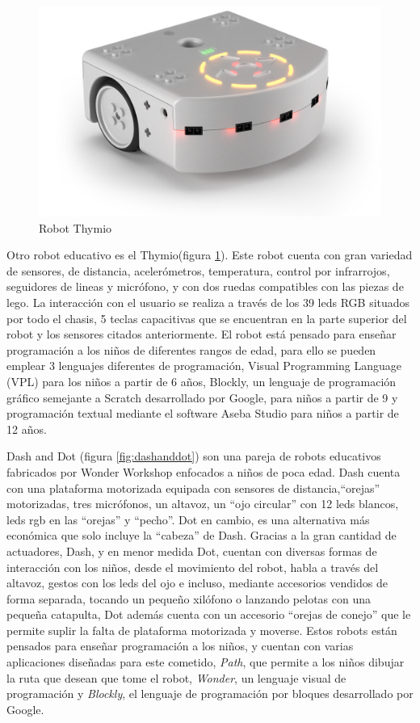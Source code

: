   \begin{figure}
	\centering
	\includegraphics[width=0.6\linewidth]{imagenes/tymio.jpg}
	\caption{Robot Thymio}
	\label{fig:thymio}
\end{figure} 
 Otro robot educativo es el Thymio(figura \ref{fig:thymio}). Este robot cuenta con gran variedad de sensores, de distancia, acelerómetros, temperatura, control por infrarrojos, seguidores de lineas y micrófono, y con dos ruedas compatibles con las piezas de lego. La interacción con el usuario se realiza a través de los 39 leds RGB situados por todo el chasis, 5 teclas capacitivas que se encuentran en la parte superior del robot y los sensores citados anteriormente. El robot está pensado para enseñar programación a los niños de diferentes rangos de edad, para ello se pueden emplear 3 lenguajes diferentes de programación, Visual Programming Language (VPL) para los niños a partir de 6 años, Blockly, un lenguaje de programación gráfico semejante a Scratch desarrollado por Google, para niños a partir de 9 y programación textual mediante el software Aseba Studio para niños a partir de 12 años.
 
 Dash and Dot (figura \ref{fig:dashanddot}) son una pareja de robots educativos fabricados por Wonder Workshop enfocados a niños de poca edad. Dash cuenta con una plataforma motorizada equipada con sensores de distancia,\enquote{orejas} motorizadas, tres micrófonos, un altavoz, un \enquote{ojo circular} con 12 leds blancos, leds rgb en las \enquote{orejas} y \enquote{pecho}. Dot en cambio, es una alternativa más económica que solo incluye la \enquote{cabeza} de Dash. Gracias a la gran cantidad de actuadores, Dash, y en menor medida Dot, cuentan con diversas formas de interacción con los niños, desde el movimiento del robot, habla a través del altavoz,  gestos con los leds del ojo e incluso, mediante accesorios vendidos de forma separada, tocando un pequeño xilófono o lanzando pelotas con una pequeña catapulta, Dot además cuenta con un accesorio \enquote{orejas de conejo} que le permite suplir la falta de plataforma motorizada y moverse. Estos robots están pensados para enseñar programación a los niños, y cuentan con varias aplicaciones diseñadas para este cometido, \textit{Path}, que permite a los niños dibujar la ruta que desean que tome el robot, \textit{Wonder}, un lenguaje visual de programación y \textit{Blockly}, el lenguaje de programación por bloques desarrollado por Google.
 
